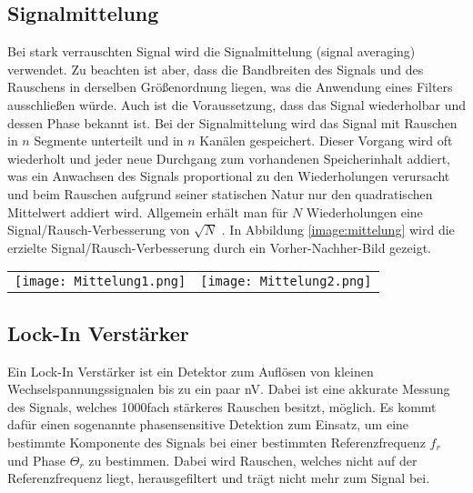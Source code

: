 \subsection{Signalmittelung}
\label{sub:mittelung}
Bei stark verrauschten Signal wird die Signalmittelung (signal averaging) verwendet. Zu beachten ist aber, dass die Bandbreiten des Signals und des Rauschens in derselben Größenordnung liegen, was die Anwendung eines Filters ausschließen würde. Auch ist die Voraussetzung, dass das Signal wiederholbar und dessen Phase bekannt ist. Bei der Signalmittelung wird das Signal mit Rauschen in $n$ Segmente unterteilt und in $n$ Kanälen gespeichert. Dieser Vorgang wird oft wiederholt und jeder neue Durchgang zum vorhandenen Speicherinhalt addiert, was ein Anwachsen des Signals proportional zu den Wiederholungen verursacht und beim Rauschen aufgrund seiner statischen Natur nur den quadratischen Mittelwert addiert wird. Allgemein erhält man für $N$ Wiederholungen eine Signal/Rausch-Verbesserung von $\sqrt{N}$ \citep{VA}. In Abbildung \ref{image:mittelung} wird die erzielte Signal/Rausch-Verbesserung durch ein Vorher-Nachher-Bild gezeigt.
\begin{center}
    \begin{tabular}{c c}
        \texttt{[image: Mittelung1.png]} &
        \texttt{[image: Mittelung2.png]}  
    \end{tabular}
    \label{image:mittelung}
\end{center}
\newpage
\subsection{Lock-In Verstärker}
\label{sub:lockin}
Ein Lock-In Verstärker ist ein Detektor zum Auflösen von kleinen Wechselspannungssignalen bis zu ein paar nV. Dabei ist eine akkurate Messung des Signals, welches 1000fach stärkeres Rauschen besitzt, möglich. Es kommt dafür einen sogenannte phasensensitive Detektion zum Einsatz, um eine bestimmte Komponente des Signals bei einer bestimmten Referenzfrequenz $f_{r}$ und Phase $\Theta_{r}$ zu bestimmen. Dabei wird Rauschen, welches nicht auf der Referenzfrequenz liegt, herausgefiltert und trägt nicht mehr zum Signal bei.
